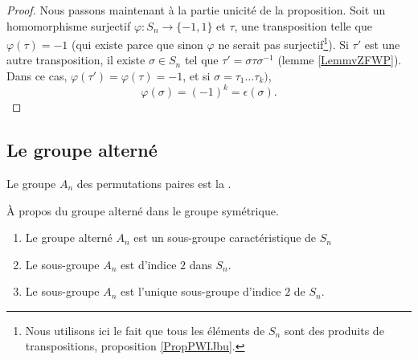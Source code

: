 \begin{proof}
    Nous passons maintenant à la partie unicité de la proposition. Soit un homomorphisme surjectif \( \varphi\colon S_n\to \{ -1,1 \}\) et \( \tau\), une transposition telle que \( \varphi(\tau)=-1\) (qui existe parce que sinon \( \varphi\) ne serait pas surjectif\footnote{Nous utilisons ici le fait que tous les éléments de \( S_n\) sont des produits de transpositions, proposition \ref{PropPWIJbu}.}). Si \( \tau'\) est une autre transposition, il existe \( \sigma\in S_n\) tel que \( \tau'=\sigma\tau\sigma^{-1}\) (lemme \ref{LemmvZFWP}). Dans ce cas, \( \varphi(\tau')=\varphi(\tau)=-1\), et si \( \sigma=\tau_1\ldots \tau_k) \),
    \begin{equation}
         \varphi(\sigma)=(-1)^k=\epsilon(\sigma).
    \end{equation}
\end{proof}

\subsection{Le groupe alterné}

\begin{definition}
Le groupe \( A_n\) des permutations paires est la .
\end{definition}

\begin{proposition} \label{PROPooCPXOooVxPAij}
    À propos du groupe alterné dans le groupe symétrique.
    \begin{enumerate}
        \item
            Le groupe alterné \( A_n\) est un sous-groupe caractéristique de \( S_n\)
        \item   \label{ITEMooWXXUooOWvFgE}
            Le sous-groupe \( A_n\) est d'indice \( 2\) dans \( S_n\).
        \item       \label{ITEMooGGAHooRYgNqq}
            Le sous-groupe \( A_n\) est l'unique sous-groupe d'indice \( 2\) de \( S_n\).
    \end{enumerate}
\end{proposition}

